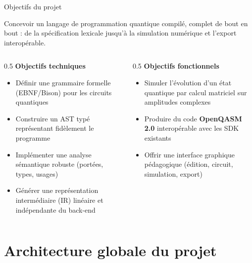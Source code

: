 \documentclass[10pt]{beamer}
\begin{document}
\begin{frame}{Objectifs du projet}
  \begin{keybox}[title=Objectif général]
    Concevoir un langage de programmation quantique compilé, complet de bout en bout : de la spécification lexicale jusqu'à la simulation numérique et l'export interopérable.
  \end{keybox}
  \vspace{4pt}
  \begin{columns}[T]
    \begin{column}{0.5\textwidth}
      \textbf{Objectifs techniques}
      \begin{itemize}
        \small
        \item Définir une grammaire formelle (EBNF/Bison) pour les circuits quantiques
        \item Construire un AST typé représentant fidèlement le programme
        \item Implémenter une analyse sémantique robuste (portées, types, usages)
        \item Générer une représentation intermédiaire (IR) linéaire et indépendante du back-end
      \end{itemize}
    \end{column}
    \begin{column}{0.5\textwidth}
      \textbf{Objectifs fonctionnels}
      \begin{itemize}
        \small
        \item Simuler l'évolution d'un état quantique par calcul matriciel sur amplitudes complexes
        \item Produire du code \textbf{OpenQASM 2.0} interopérable avec les SDK existants
        \item Offrir une interface graphique pédagogique (édition, circuit, simulation, export)
      \end{itemize}
    \end{column}
  \end{columns}
\end{frame}

\section{Architecture globale du projet}
\end{document}
